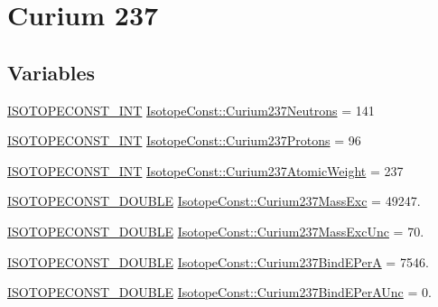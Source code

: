 \hypertarget{group___isotope_const-_curium-_cm237}{}\section{Curium 237}
\label{group___isotope_const-_curium-_cm237}
\subsection*{Variables}
\begin{DoxyCompactItemize}
\item 
\mbox{\hyperlink{group___isotope_const-_macros_ga5f18360b3e99483a35c32d789e62621c}{I\+S\+O\+T\+O\+P\+E\+C\+O\+N\+S\+T\+\_\+\+I\+NT}} \mbox{\hyperlink{group___isotope_const-_curium-_cm237_ga34d6e32b89b5e62aebd9af86073b0010}{Isotope\+Const\+::\+Curium237\+Neutrons}} = 141
\item 
\mbox{\hyperlink{group___isotope_const-_macros_ga5f18360b3e99483a35c32d789e62621c}{I\+S\+O\+T\+O\+P\+E\+C\+O\+N\+S\+T\+\_\+\+I\+NT}} \mbox{\hyperlink{group___isotope_const-_curium-_cm237_gaf8851a03235527d67776b7da3ddc1daf}{Isotope\+Const\+::\+Curium237\+Protons}} = 96
\item 
\mbox{\hyperlink{group___isotope_const-_macros_ga5f18360b3e99483a35c32d789e62621c}{I\+S\+O\+T\+O\+P\+E\+C\+O\+N\+S\+T\+\_\+\+I\+NT}} \mbox{\hyperlink{group___isotope_const-_curium-_cm237_gacb97c0ea6a25d547cc3e34d83370d08c}{Isotope\+Const\+::\+Curium237\+Atomic\+Weight}} = 237
\item 
\mbox{\hyperlink{group___isotope_const-_macros_ga8f45a7272ce02c0b4c65c44636ed719a}{I\+S\+O\+T\+O\+P\+E\+C\+O\+N\+S\+T\+\_\+\+D\+O\+U\+B\+LE}} \mbox{\hyperlink{group___isotope_const-_curium-_cm237_ga6c37cec253e800b751fc6c20621ef4b9}{Isotope\+Const\+::\+Curium237\+Mass\+Exc}} = 49247.
\item 
\mbox{\hyperlink{group___isotope_const-_macros_ga8f45a7272ce02c0b4c65c44636ed719a}{I\+S\+O\+T\+O\+P\+E\+C\+O\+N\+S\+T\+\_\+\+D\+O\+U\+B\+LE}} \mbox{\hyperlink{group___isotope_const-_curium-_cm237_ga11682f36668aaeb27b71b1ffaf8716a9}{Isotope\+Const\+::\+Curium237\+Mass\+Exc\+Unc}} = 70.
\item 
\mbox{\hyperlink{group___isotope_const-_macros_ga8f45a7272ce02c0b4c65c44636ed719a}{I\+S\+O\+T\+O\+P\+E\+C\+O\+N\+S\+T\+\_\+\+D\+O\+U\+B\+LE}} \mbox{\hyperlink{group___isotope_const-_curium-_cm237_gaff3512c46c4949dd78eb1af94f7f2c92}{Isotope\+Const\+::\+Curium237\+Bind\+E\+PerA}} = 7546.
\item 
\mbox{\hyperlink{group___isotope_const-_macros_ga8f45a7272ce02c0b4c65c44636ed719a}{I\+S\+O\+T\+O\+P\+E\+C\+O\+N\+S\+T\+\_\+\+D\+O\+U\+B\+LE}} \mbox{\hyperlink{group___isotope_const-_curium-_cm237_gaa8ce62d70d4ecdc65182340dd23a349f}{Isotope\+Const\+::\+Curium237\+Bind\+E\+Per\+A\+Unc}} = 0.

\end{DoxyCompactItemize}
